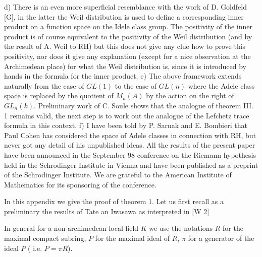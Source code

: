 \smallskip 
 d) There is an even more superficial resemblance with the work of D. 
Goldfeld [G],
 in the latter the Weil distribution is used to define a corresponding 
inner product
 on a function space on the Idele class group. The positivity of the 
inner product 
is of course equivalent to the positivity of the Weil distribution (and 
by the 
result of A. Weil to RH) but this does not give any clue how to prove 
this 
positivity, nor does it give any explanation (except for a nice 
observation
 at the Archimedean place) for what the Weil distribution is, since it 
is 
introduced by hands in the formula for the inner product.
\smallskip
e) The above framework extends naturally from the case of $ GL(1)$ 
to the case of $GL(n)$ where the Adele class space is replaced by 
the quotient of $M_n(A)$ by the action on the right of $ GL_n(k)$.
 Preliminary work of C. Soule shows that the analogue of theorem III. 1
 remains valid, the next step is to work out the analogue of the 
Lefchetz
 trace formula in this context. 
\smallskip
f) I have been told by P. Sarnak and E. Bombieri that Paul Cohen has
 considered the space of Adele classes in connection with RH, but never
 got any detail of his unpublished ideas.
\smallskip
All the results of the present paper have been announced in the 
September 98
 conference on the Riemann hypothesis held in the Schrodinger Institute 
in Vienna and 
have been published as a preprint of the Schrodinger Institute. We are 
grateful to the American
Institute of Mathematics for its sponsoring of the conference.

\vglue 1cm









\medskip


\smallskip


In this appendix we give the proof of theorem 1. Let us first recall as 
a preliminary the results of Tate an Iwasawa
as interpreted in [W 2]


\smallskip
In general for a non archimedean local field $K$ we use the 
notations $R$ for the maximal compact subring, $P$ for the maximal ideal 
of $R$, $\pi $ for a generator of  
the ideal $P$ ( i.e.  $P = \pi R$).

